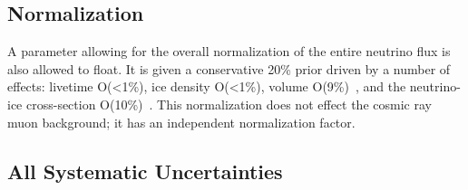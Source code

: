 \documentclass[main.tex]{subfiles}
\begin{document}
\subsection{Normalization}

A parameter allowing for the overall normalization of the entire neutrino flux is also allowed to float. 
It is given a conservative 20\% prior driven by a number of effects: livetime O(<1\%), ice density O(<1\%), volume O(9\%)~\cite{Sandrock_2020}, and the neutrino-ice cross-section O(10\%)~\cite{candido2023neutrino}. 
This normalization does not effect the cosmic ray muon background; it has an independent normalization factor. 

\iffalse
\subsection{All Systematic Uncertainties}
\end{document}
